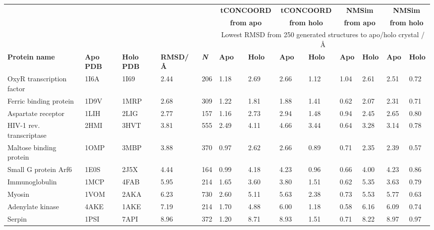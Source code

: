 \begin{table}
\centering

\begin{footnotesize}
\begin{tabular}{ l l l l l l l l l l l l l }
\hline
 &  &  &  &  & \multicolumn{2}{c}{\textbf{tCONCOORD}} & \multicolumn{2}{c}{\textbf{tCONCOORD}} & \multicolumn{2}{c}{\textbf{NMSim}}    & \multicolumn{2}{c}{\textbf{NMSim}} \\
 &  &  &  &  & \multicolumn{2}{c}{\textbf{from apo}}  & \multicolumn{2}{c}{\textbf{from holo}} & \multicolumn{2}{c}{\textbf{from apo}} & \multicolumn{2}{c}{\textbf{from holo}} \\
 &  &  &  &  & \multicolumn{8}{c}{Lowest RMSD from 250 generated structures to apo/holo crystal / \AA} \\
\textbf{Protein name} & \textbf{Apo PDB} & \textbf{Holo PDB} & \textbf{RMSD\newline / \AA} & \textit{\textbf{N}} & \textbf{Apo} & \textbf{Holo} & \textbf{Apo} & \textbf{Holo} & \textbf{Apo} & \textbf{Holo} & \textbf{Apo} & \textbf{Holo} \\
\hline
OxyR transcription factor & 1I6A & 1I69 & 2.44 & 206 & 1.18 & 2.69 & 2.66 & 1.12 & 1.04 & 2.61 & 2.51 & 0.72 \\
Ferric binding protein    & 1D9V & 1MRP & 2.68 & 309 & 1.22 & 1.81 & 1.88 & 1.41 & 0.62 & 2.07 & 2.31 & 0.71 \\
Aspartate receptor        & 1LIH & 2LIG & 2.77 & 157 & 1.16 & 2.73 & 2.94 & 1.48 & 0.94 & 2.45 & 2.65 & 0.80 \\
HIV-1 rev. transcriptase  & 2HMI & 3HVT & 3.81 & 555 & 2.49 & 4.11 & 4.66 & 3.44 & 0.64 & 3.28 & 3.14 & 0.78 \\
Maltose binding protein   & 1OMP & 3MBP & 3.88 & 370 & 0.97 & 2.62 & 2.66 & 0.89 & 0.71 & 2.35 & 2.39 & 0.57 \\
Small G protein Arf6      & 1E0S & 2J5X & 4.44 & 164 & 0.99 & 4.18 & 4.23 & 0.96 & 0.66 & 4.00 & 4.23 & 0.86 \\
Immunoglobulin            & 1MCP & 4FAB & 5.95 & 214 & 1.65 & 3.60 & 3.80 & 1.51 & 0.62 & 5.35 & 3.63 & 0.79 \\
Myosin                    & 1VOM & 2AKA & 6.23 & 730 & 2.60 & 5.11 & 5.63 & 2.38 & 0.73 & 5.53 & 5.77 & 0.63 \\
Adenylate kinase          & 4AKE & 1AKE & 7.19 & 214 & 1.70 & 4.88 & 6.00 & 1.18 & 0.58 & 6.16 & 6.09 & 0.74 \\
Serpin                    & 1PSI & 7API & 8.96 & 372 & 1.20 & 8.71 & 8.93 & 1.51 & 0.71 & 8.22 & 8.97 & 0.97 \\

\end{tabular}
\end{footnotesize}
\end{table}
